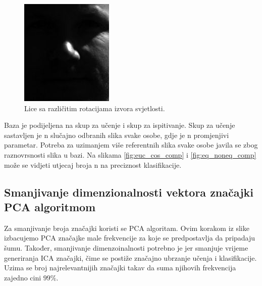 \documentclass[times, utf8, seminar, numeric]{fer}
\begin{document}
\begin{figure}[!htb]
\endminipage\hfill
{}%
  \includegraphics[width=\linewidth]{raw/yaleB03_P00A-110E+40.jpg}
\endminipage
\caption{Lice sa različitim rotacijama izvora svjetlosti.}\label{fig:cropped_images}
\end{figure}

Baza je podijeljena na skup za učenje i skup za ispitivanje. Skup za učenje sastavljen je n slučajno odbranih slika svake osobe, gdje je n promjenjivi parametar. Potreba za uzimanjem više referentnih slika svake osobe javila se zbog raznovrsnosti slika u bazi. Na slikama \ref{fig:euc_cos_comp} i \ref{fig:eq_noneq_comp} može se vidjeti utjecaj broja n na preciznost klasifikacije.

\subsection{Smanjivanje dimenzionalnosti vektora značajki PCA algoritmom}

Za smanjivanje broja značajki koristi se PCA algoritam. Ovim korakom iz slike izbacujemo PCA značajke male frekvencije za koje se predpostavlja da pripadaju šumu. Također, smanjivanje dimenzoinalnosti potrebno je jer smanjuje vrijeme generiranja ICA značajki, čime se postiže značajno ubrzanje učenja i klasifikacije. Uzima se broj najrelevantnijih značajki takav da suma njihovih frekvencija zajedno cini $99\%$.
\end{document}
